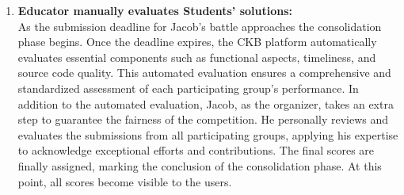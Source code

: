 \begin{enumerate}

    \item \textbf{Educator manually evaluates Students' solutions:} \\
    As the submission deadline for Jacob's battle approaches the consolidation phase begins. Once the deadline expires, the CKB platform automatically evaluates essential components such as functional aspects, timeliness, and source code quality. This automated evaluation ensures a comprehensive and standardized assessment of each participating group's performance. In addition to the automated evaluation, Jacob, as the organizer, takes an extra step to guarantee the fairness of the competition. He personally reviews and evaluates the submissions from all participating groups, applying his expertise to acknowledge exceptional efforts and contributions. The final scores are finally assigned, marking the conclusion of the consolidation phase. At this point, all scores become visible to the users. 
    


\end{enumerate}
